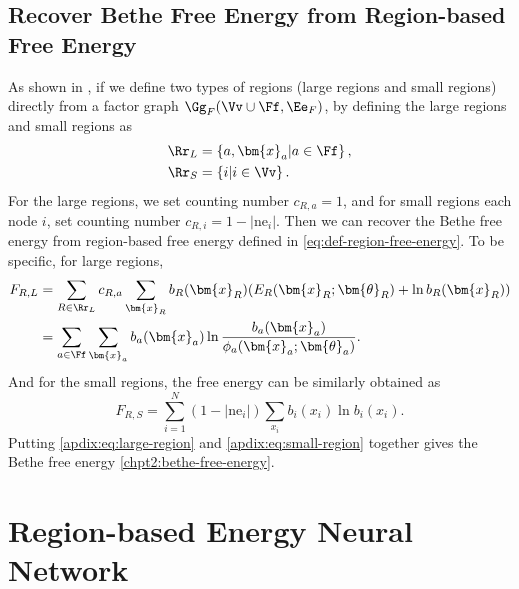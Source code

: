 \subsection{Recover Bethe Free Energy from Region-based Free Energy}
\label{apdix:sec:get-bethe-from-region-energy}
As shown in \cite{yedida2005constucting},
if we define two types of regions (large regions and small
regions) directly from a factor graph $\Gg_F(\Vv \cup \Ff, \Ee_F)$, by defining the large regions and small regions as
\begin{align}
  \Rr_{L} &= \left\{ a, \bm{x}_a| a\in \Ff \right\}, \nonumber \\
  \Rr_{S} &= \left\{ i | i \in \Vv \right\}.
\end{align}
For the large regions, we set counting number $c_{R,a}=1$, and for small regions each node $i$, set counting number $c_{R,i}=1-|\mathrm{ne}_i|$. Then we can recover the Bethe free energy from region-based free energy defined in 
\eqref{eq:def-region-free-energy}. To be specific, for
large regions,
\begin{align}\label{apdix:eq:large-region}
  F_{R,L} &=\sum_{R\in \Rr_{L}} c_{R,a}
                              \sum_{\bm{x}_R}b_R(\bm{x}_R) (E_R(\bm{x}_R;\bm{\theta}_R) + \ln{b_R}(\bm{x}_R))
                              \nonumber \\
                            & =\sum_{a\in \Ff} \sum_{\bm{x}_a} b_a(\bm{x}_a)\ln{\frac{b_a(\bm{x}_a)}{\phi_a(\bm{x}_a; \bm{\theta}_a)}}.
\end{align}
And for the small regions, the free energy can be similarly obtained as
\begin{equation}\label{apdix:eq:small-region}
  F_{R,S}  =  \sum_{i=1}^{N} (1- |\mathrm{ne}_i|) \sum_{x_i} b_i(x_i) \ln{b_i(x_i)}.
\end{equation}
Putting \eqref{apdix:eq:large-region} and \eqref{apdix:eq:small-region} together gives the Bethe free energy \ref{chpt2:bethe-free-energy}.






\section{Region-based Energy Neural Network}

